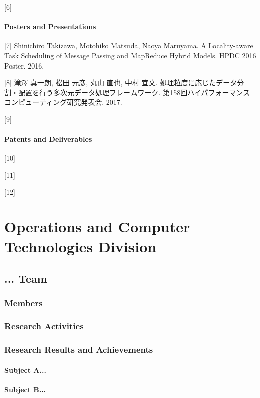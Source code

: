 \documentclass{book}
\begin{document}
[6]

\subsection{Posters and Presentations}

[7] Shinichiro Takizawa, Motohiko Matsuda, Naoya Maruyama. A Locality-aware Task Scheduling of Message Passing and MapReduce Hybrid Models. HPDC 2016 Poster. 2016.

[8] 滝澤 真一朗, 松田 元彦, 丸山 直也, 中村 宜文. 処理粒度に応じたデータ分割・配置を行う多次元データ処理フレームワーク. 第158回ハイパフォーマンスコンピューティング研究発表会. 2017.

[9]

\subsection{Patents and Deliverables}

[10]

[11]

[12]

\part{Operations and Computer Technologies Division}

\chapter{... Team}

\section{Members}

\section{Research Activities}

\section{Research Results and Achievements}

\subsection{Subject A...}

\subsection{Subject B...}
\end{document}
